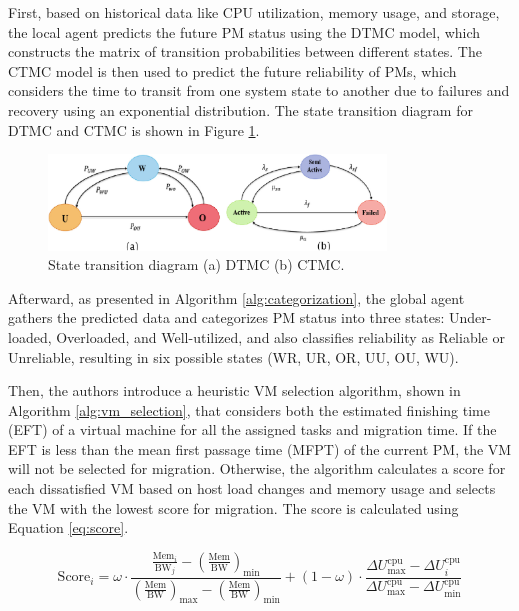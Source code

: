\documentclass[UTF8, fontset=windows]{article}
\begin{document}
First, based on historical data like CPU utilization, memory usage, and storage, the local agent predicts the future PM status using the DTMC model, which constructs the matrix of transition probabilities between different states. The CTMC model is then used to predict the future reliability of PMs, which considers the time to transit from one system state to another due to failures and recovery using an exponential distribution. The state transition diagram for DTMC and CTMC is shown in Figure \ref{fig:dtmc}.

\begin{figure}[h]  
  \centering
  \includegraphics[width=0.8\textwidth]{images/transition.png}
  \caption{State transition diagram (a) DTMC (b) CTMC.}
  \label{fig:dtmc}
\end{figure}

Afterward, as presented in Algorithm \ref{alg:categorization}, the global agent gathers the predicted data and categorizes PM status into three states: Under-loaded, Overloaded, and Well-utilized, and also classifies reliability as Reliable or Unreliable, resulting in six possible states (WR, UR, OR, UU, OU, WU).

Then, the authors introduce a heuristic VM selection algorithm, shown in Algorithm \ref{alg:vm_selection}, that considers both the estimated finishing time (EFT) of a virtual machine for all the assigned tasks and migration time. If the EFT is less than the mean first passage time (MFPT) of the current PM, the VM will not be selected for migration. Otherwise, the algorithm calculates a score for each dissatisfied VM based on host load changes and memory usage and selects the VM with the lowest score for migration. The score is calculated using Equation \ref{eq:score}.

\begin{equation}
  \text{Score}_i = \omega \cdot \frac{\frac{\text{Mem}_i}{\text{BW}_j} - \left(\frac{\text{Mem}}{\text{BW}}\right)_{\text{min}}}{\left(\frac{\text{Mem}}{\text{BW}}\right)_{\text{max}} - \left(\frac{\text{Mem}}{\text{BW}}\right)_{\text{min}}} 
  + (1 - \omega) \cdot \frac{\Delta U^{\text{cpu}}_{\text{max}} - \Delta U^{\text{cpu}}_i}{\Delta U^{\text{cpu}}_{\text{max}} - \Delta U^{\text{cpu}}_{\text{min}}}
\label{eq:score}
\end{equation}
\end{document}
